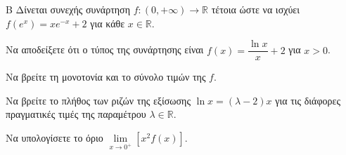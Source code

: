 \begin{thema}{Β}
Δίνεται συνεχής συνάρτηση $f: (0, +\infty) \to \mathbb{R}$ τέτοια ώστε να ισχύει $f(e^x) = x e^{-x} + 2$ για κάθε $x \in \mathbb{R}$.
\begin{erwthma}
  \item Να αποδείξετε ότι ο τύπος της συνάρτησης είναι $f(x) = \dfrac{\ln x}{x} + 2$ για $x > 0$.
  \item Να βρείτε τη μονοτονία και το σύνολο τιμών της $f$.
  \item Να βρείτε το πλήθος των ριζών της εξίσωσης $\ln x = (\lambda - 2) x$ για τις διάφορες πραγματικές τιμές της παραμέτρου $\lambda \in \mathbb{R}$.
  \item Να υπολογίσετε το όριο $\lim\limits_{x \to 0^+} [x^2 f(x)]$.
\end{erwthma}
\end{thema}
